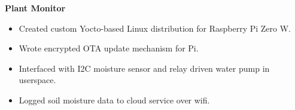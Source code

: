 \noindent \textbf{Plant Monitor}
\begin{itemize}
    \item Created custom Yocto-based Linux distribution for Raspberry Pi Zero W.
    \item Wrote encrypted OTA update mechanism for Pi.
    \item Interfaced with I2C moisture sensor and relay driven water pump in userspace.
    \item Logged soil moisture data to cloud service over wifi.
\end{itemize}

